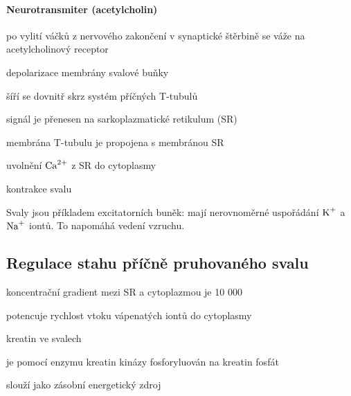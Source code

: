 \documentclass[DIV=8]{scrreprt}
\begin{document}
\paragraph{Neurotransmiter (acetylcholin)}
\begin{myEnumerate}[nosep]
    \item po vylití váčků z nervového zakončení v synaptické štěrbině se váže na acetylcholinový receptor
    \item depolarizace membrány svalové buňky
    \item šíří se dovnitř skrz systém příčných T-tubulů
    \item signál je přenesen na sarkoplazmatické retikulum (SR)
\begin{myItemize}[nosep]
    \item membrána T-tubulu je propojena s membránou SR
\end{myItemize}

    \item uvolnění \(\ce{Ca^{2+}}\) z SR do cytoplasmy
    \item kontrakce svalu
\end{myEnumerate}



Svaly jsou příkladem excitatorních buněk: mají nerovnoměrné uspořádání \(\ce{K+}\) a \(\ce{Na+}\) iontů. To napomáhá vedení vzruchu.

\subsection{Regulace stahu příčně pruhovaného svalu} \label{Regulace stahu příčně pruhovaného svalu}


\begin{myItemize}[nosep]
    \item koncentrační gradient mezi SR a cytoplazmou je 10 000
\begin{myItemize}[nosep]
    \item potencuje rychlost vtoku vápenatých iontů do cytoplasmy
\end{myItemize}

    \item kreatin ve svalech
\begin{myItemize}[nosep]
    \item je pomocí enzymu kreatin kinázy fosforyluován na kreatin fosfát
    \item slouží jako zásobní energetický zdroj
\end{myItemize}

\end{myItemize}
\end{document}
